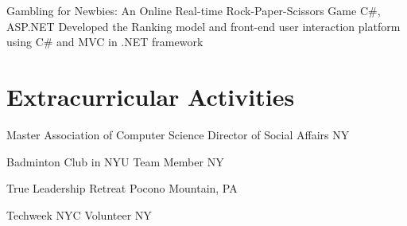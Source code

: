 \documentclass[11pt,a4paper,sans]{moderncv}   %
\begin{document}
{Gambling for Newbies: An Online Real-time Rock-Paper-Scissors Game}
{C\#, ASP.NET}
{}{}
{{Developed the Ranking model and front-end user interaction platform using C\# and MVC in .NET framework}
}

\section{Extracurricular Activities}
{Master Association of Computer Science}
{Director of Social Affairs}
{NY}{}{}

{Badminton Club in NYU}
{Team Member}
{NY}{}{}

{True Leadership Retreat}
{}
{Pocono Mountain, PA}
{}{}

{Techweek NYC}
{Volunteer}
{NY}
{}{}


\renewcommand{\baselinestretch}{1.0}

\closesection{}                   %
\renewcommand{\listitemsymbol}{-} %
\end{document}
